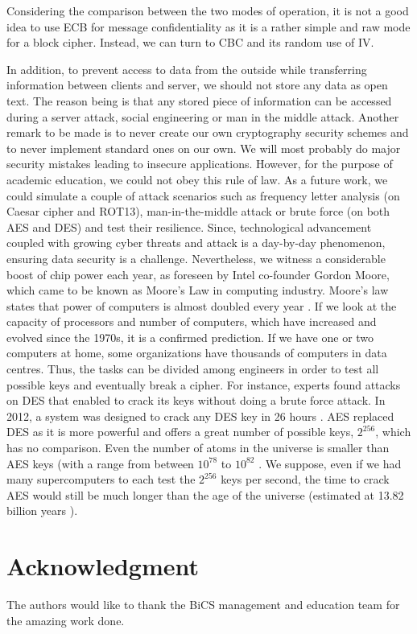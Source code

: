 Considering the comparison between the two modes of operation, it is not a good idea to use ECB for message confidentiality as it is a rather simple and raw mode for a block cipher. Instead, we can turn to CBC and its random use of IV. 

In addition, to prevent access to data from the outside while transferring information between clients and server, we should not store any data as open text. The reason being is that any stored piece of information can be accessed during a server attack, social engineering or man in the middle attack. Another remark to be made is to never create our own cryptography security schemes and to never implement standard ones on our own. We will most probably do major security mistakes leading to insecure applications. However, for the purpose of academic education, we could not obey this rule of law. 
As a future work, we could simulate a couple of attack scenarios such as frequency letter analysis (on Caesar cipher and ROT13), man-in-the-middle attack or brute force (on both AES and DES) and test their resilience. Since, technological advancement coupled with growing cyber threats and attack is a day-by-day phenomenon, ensuring data security is a challenge. Nevertheless, we witness a considerable boost of chip power each year, as foreseen by Intel co-founder Gordon Moore, which came to be known as Moore’s Law in computing industry. Moore’s law states that power of computers is almost doubled every year \cite{moore}. If we look at the capacity of processors and number of computers, which have increased and evolved since the 1970s, it is a confirmed prediction. If we have one or two computers at home, some organizations have thousands of computers in data centres. Thus, the tasks can be divided among engineers in order to test all possible keys and eventually break a cipher. For instance, experts found attacks on DES that enabled to crack its keys without doing a brute force attack. In 2012, a system was designed to crack any DES key in 26 hours \cite{crack.sh}. AES replaced DES as it is more powerful and offers a great number of possible keys, $2^{256}$, which has no comparison.  Even the number of atoms in the universe is smaller than AES keys (with a range from between $10^{78}$ to $10^{82}$ \cite{atoms}. We suppose, even if we had many supercomputers to each test the $2^{256}$ keys per second, the time to crack AES would still be much longer than the age of the universe (estimated at 13.82 billion years \cite{universe}).


\section*{Acknowledgment}
The authors would like to thank the BiCS management and education team for the amazing work done.
